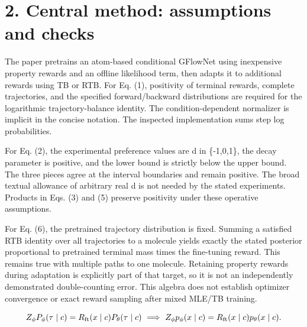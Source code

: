 \documentclass[10pt]{article}
\begin{document}
\section*{2. Central method: assumptions and checks}
The paper pretrains an atom-based conditional GFlowNet using inexpensive property rewards and an offline likelihood term, then adapts it to additional rewards using TB or RTB. For Eq. (1), positivity of terminal rewards, complete trajectories, and the specified forward/backward distributions are required for the logarithmic trajectory-balance identity. The condition-dependent normalizer is implicit in the concise notation. The inspected implementation sums step log probabilities.\par
For Eq. (2), the experimental preference values are d in \{-1,0,1\}, the decay parameter is positive, and the lower bound is strictly below the upper bound. The three pieces agree at the interval boundaries and remain positive. The broad textual allowance of arbitrary real d is not needed by the stated experiments. Products in Eqs. (3) and (5) preserve positivity under these operative assumptions.\par
For Eq. (6), the pretrained trajectory distribution is fixed. Summing a satisfied RTB identity over all trajectories to a molecule yields exactly the stated posterior proportional to pretrained terminal mass times the fine-tuning reward. This remains true with multiple paths to one molecule. Retaining property rewards during adaptation is explicitly part of that target, so it is not an independently demonstrated double-counting error. This algebra does not establish optimizer convergence or exact reward sampling after mixed MLE/TB training.\par
\[Z_\phi P_\phi(\tau\mid c)=R_{\rm ft}(x\mid c)P_\theta(\tau\mid c)\ \Longrightarrow\ Z_\phi p_\phi(x\mid c)=R_{\rm ft}(x\mid c)p_\theta(x\mid c).\]\par
\end{document}

